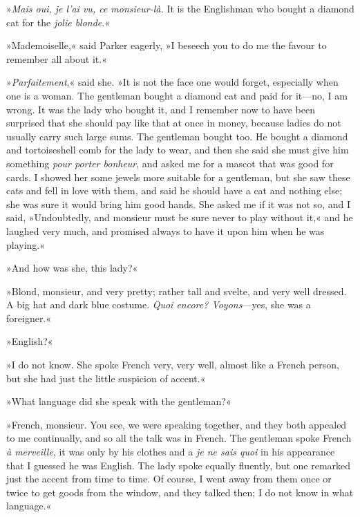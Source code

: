 »\foreignlanguage{french}{\textit{Mais oui, je l'ai vu, ce monsieur-là.}} It is the Englishman who bought a diamond cat for the \foreignlanguage{french}{\textit{jolie blonde}}.«

»Mademoiselle,« said Parker eagerly, »I beseech you to do me the favour to remember all about it.«

»\foreignlanguage{french}{\textit{Parfaitement},}« said she. »It is not the face one would forget, especially when one is a woman. The gentleman bought a diamond cat and paid for it—no, I am wrong. It was the lady who bought it, and I remember now to have been surprised that she should pay like that at once in money, because ladies do not usually carry such large sums. The gentleman bought too. He bought a diamond and tortoiseshell comb for the lady to wear, and then she said she must give him something \foreignlanguage{french}{\textit{pour porter bonheur}}, and asked me for a mascot that was good for cards. I showed her some jewels more suitable for a gentleman, but she saw these cats and fell in love with them, and said he should have a cat and nothing else; she was sure it would bring him good hands. She asked me if it was not so, and I said, »Undoubtedly, and monsieur must be sure never to play without it,« and he laughed very much, and promised always to have it upon him when he was playing.«

»And how was she, this lady?«

»Blond, monsieur, and very pretty; rather tall and svelte, and very well dressed. A big hat and dark blue costume. \foreignlanguage{french}{\textit{Quoi encore? Voyons}}—yes, she was a foreigner.«

»English?«

»I do not know. She spoke French very, very well, almost like a French person, but she had just the little suspicion of accent.«

»What language did she speak with the gentleman?«

»French, monsieur. You see, we were speaking together, and they both appealed to me continually, and so all the talk was in French. The gentleman spoke French \foreignlanguage{french}{\textit{à merveille}}, it was only by his clothes and a \foreignlanguage{french}{\textit{je ne sais quoi}} in his appearance that I guessed he was English. The lady spoke equally fluently, but one remarked just the accent from time to time. Of course, I went away from them once or twice to get goods from the window, and they talked then; I do not know in what language.«

